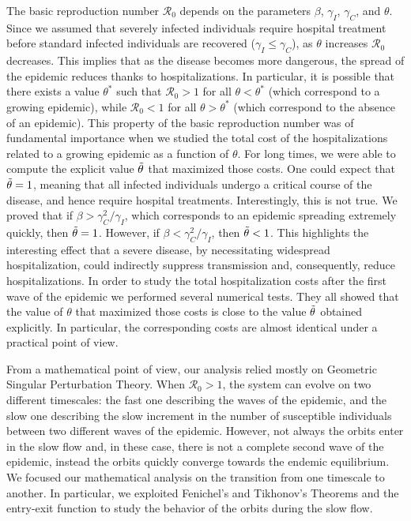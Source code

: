 \documentclass[11pt,reqno]{amsart}
\theoremstyle{boldremark}
\begin{document}
The basic reproduction number $\mathcal{R}_0$ depends on the parameters $\beta$, $\gamma_I$, $\gamma_C$, and $\theta$. Since we assumed that severely infected individuals require hospital treatment before standard infected individuals are recovered ($\gamma_I \le \gamma_C$), as $\theta$ increases $\mathcal{R}_0$ decreases. This implies that as the disease becomes more dangerous, the spread of the epidemic reduces thanks to hospitalizations. In particular, it is possible that there exists a value $\theta^*$ such that $\mathcal{R}_0>1$ for all $\theta<\theta^*$ (which correspond to a growing epidemic), while $\mathcal{R}_0 < 1$ for all $\theta > \theta^*$ (which correspond to the absence of an epidemic). This property of the basic reproduction number was of fundamental importance when we studied the total cost of the hospitalizations related to a growing epidemic as a function of $\theta$. For long times, we were able to compute the explicit value $\Tilde{\theta}$ that maximized those costs. One could expect that $\Tilde{\theta}=1$, meaning that all infected individuals undergo a critical course of the disease, and hence require hospital treatments. Interestingly, this is not true. We proved that if $\beta > \gamma_C^2/\gamma_I$, which corresponds to an epidemic spreading extremely quickly, then $\Tilde{\theta}=1$. However, if $\beta < \gamma_C^2/\gamma_I$, then $\Tilde{\theta}<1$. This highlights the interesting effect that a severe disease, by necessitating widespread hospitalization, could indirectly suppress transmission and, consequently, reduce hospitalizations. In order to study the total hospitalization costs after the first wave of the epidemic we performed several numerical tests. They all showed that the value of $\theta$ that maximized those costs is close to the value $\Tilde{\theta}$ obtained explicitly. In particular, the corresponding costs are almost identical under a practical point of view. 

From a mathematical point of view, our analysis relied mostly on Geometric Singular Perturbation Theory. When $\mathcal{R}_0>1$, the system can evolve on two different timescales: the fast one describing the waves of the epidemic, and the slow one describing the  slow increment in the number of susceptible individuals between two different waves of the epidemic. However, not always the orbits enter in the slow flow and, in these case, there is not a complete second wave of the epidemic, instead the orbits quickly converge towards the endemic equilibrium. We focused our mathematical analysis on the transition from one timescale to another. In particular, we exploited Fenichel's and Tikhonov's Theorems and the entry-exit function to study the behavior of the orbits during the slow flow.
\end{document}
